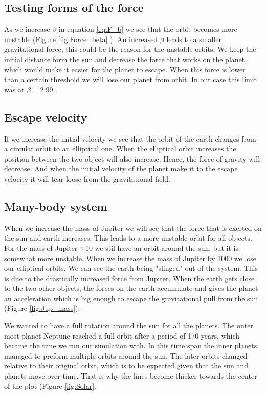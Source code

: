 \documentclass{article}
\begin{document}
\begin{multicols}{2}
\subsection{Testing forms of the force}

As we increase $\beta$ in equation \ref{eq:F_b} we see that the orbit becomes more unstable (Figure \ref{fig:Force_beta} ). An increased $\beta$ leads to a smaller gravitational force, this could be the reason for the unstable orbits. We keep the initial distance form the sun and decrease the force that works on the planet, which would make it easier for the planet to escape. When this force is lower than a certain threshold we will lose our planet from orbit. In our case this limit was at $\beta=2.99$.

\subsection{Escape velocity}

If we increase the initial velocity we see that the orbit of the earth changes from a circular orbit to an elliptical one. When the elliptical orbit increases the position between the two object will also increase. Hence, the force of gravity will decrease. And when the initial velocity of the planet make it to the escape velocity it will tear loose from the gravitational field.

\subsection{Many-body system}

When we increase the mass of Jupiter we will see that the force that is exerted on the sun and earth increases. This leads to a more unstable orbit for all objects. For the mass of Jupiter $\times 10$ we stil have an orbit around the sun, but it is somewhat more unstable. When we increase the mass of Jupiter by 1000 we lose our elliptical orbits. We can see the earth being "slinged" out of the system. This is due to the drastically increased force from Jupiter. When the earth gets close to the two other objects, the forces on the earth accumulate and gives the planet an acceleration which is big enough to escape the gravitational pull from the sun (Figure \ref{fig:Jup_mass}). 

We wanted to have a full rotation around the sun for all the planets. The outer most planet Neptune reached a full orbit after a period of 170 years, which became the time we run our simulation with. In this time span the inner planets managed to preform multiple orbits around the sun. The later orbits changed relative to their original orbit, which is to be expected given that the sun and planets move over time. That is why the lines become thicker towards the center of the plot (Figure \ref{fig:Solar}. 


\end{multicols}
\end{document}
